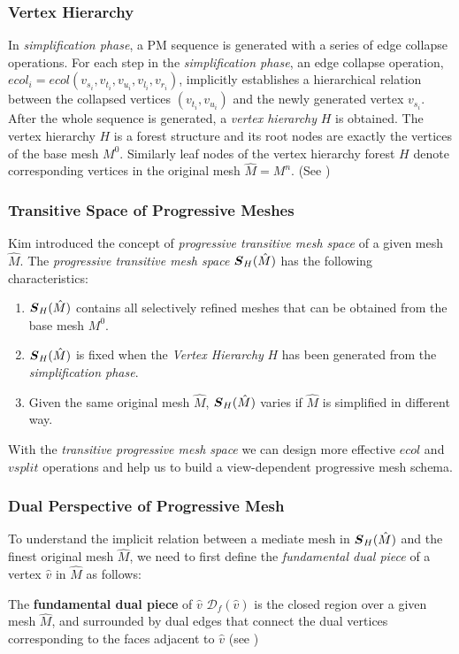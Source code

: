 \subsubsection{Vertex Hierarchy}
\label{subsection:theoreticalVHF}
In \emph{simplification phase}, a PM sequence is generated with a series of edge collapse operations\cite{Hoppe:1997:VRP}. For each step in the \emph{simplification phase}, an edge collapse operation, $ecol_i=ecol(v_{s_i},v_{t_i},v_{u_i},v_{l_i},v_{r_i})$, implicitly establishes a hierarchical relation between the collapsed vertices $(v_{t_i},v_{u_i})$ and the newly generated vertex $v_{s_i}$. After the whole sequence is generated, a \emph{vertex hierarchy} $H$ is obtained. The vertex hierarchy $H$ is a forest structure and its root nodes are exactly the vertices of the base mesh $M^0$. Similarly leaf nodes of the vertex hierarchy forest $H$ denote corresponding vertices in the original mesh $\hat{M}=M^n$. (See )\\

\subsubsection{Transitive Space of Progressive Meshes}
\label{theo:tspm}
Kim \etal\cite{Kim:2003:TransitiveMeshSpace}\cite{Kim:2001:trulyselective} introduced the concept of \emph{progressive transitive mesh space} of a given mesh $\hat{M}$. The \emph{progressive transitive mesh space $\boldsymbol{S}_H(\hat{M})$} has the following characteristics:
\begin{enumerate}
\item
$\boldsymbol{S}_H(\hat{M})$ contains all selectively refined meshes that can be obtained from the base mesh $M^0$.
\item
$\boldsymbol{S}_H(\hat{M})$ is fixed when the \emph{Vertex Hierarchy} $H$ has been generated from the \emph{simplification phase}. 
\item
Given the same original mesh $\hat{M}$, $\boldsymbol{S}_H(\hat{M})$ varies if $\hat{M}$ is simplified in different way. 
\end{enumerate}
With the \emph{transitive progressive mesh space} we can design more effective $ecol$ and $vsplit$ operations and help us to build a view-dependent progressive mesh schema. 
\subsubsection{Dual Perspective of Progressive Mesh}
\label{theo:dppm}
To understand the implicit relation between a mediate mesh in $\boldsymbol{S}_H(\hat{M})$ and the finest original mesh $\hat{M}$, we need to first define the \emph{fundamental dual piece} of a vertex $\hat{v}$ in $\hat{M}$ as follows\cite{Kim:2001:trulyselective}: 
\begin{defn}
The \textbf{fundamental dual piece} of $\hat{v}$ $\mathcal{D}_f(\hat{v})$ is the closed region over a given mesh $\hat{M}$, and surrounded by dual edges that connect the dual vertices corresponding to the faces adjacent to $\hat{v}$ (see )
\end{defn}


